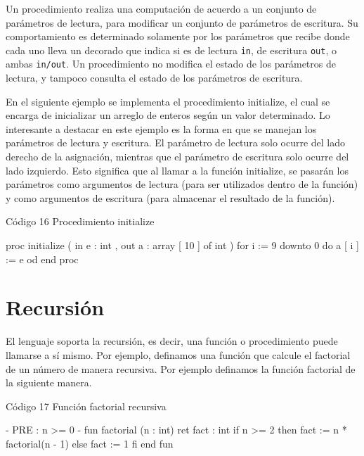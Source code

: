 Un procedimiento realiza una computación de acuerdo a un conjunto de parámetros de lectura, para modificar un conjunto de parámetros de escritura. Su comportamiento es determinado solamente por los parámetros que recibe donde cada uno lleva un decorado que indica si es de lectura \texttt{in}, de escritura \texttt{out}, o ambas \texttt{in/out}. Un procedimiento no modifica el estado de los parámetros de lectura, y tampoco consulta el estado de los parámetros de escritura.

En el siguiente ejemplo se implementa el procedimiento initialize, el cual se encarga de inicializar un arreglo de enteros según un valor determinado. Lo interesante a destacar en este ejemplo es la forma en que se manejan los parámetros de lectura y escritura. El parámetro de lectura solo ocurre del lado derecho de la asignación, mientras que el parámetro de escritura solo ocurre del lado izquierdo. Esto significa que al llamar a la función initialize, se pasarán los parámetros como argumentos de lectura (para ser utilizados dentro de la función) y como argumentos de escritura (para almacenar el resultado de la función).

\begin{codebox}{Código 16}
\footnotesize Procedimiento initialize
\tcblower
\begin{pascallike}
proc initialize ( in e : int , out a : array [ 10 ] of int )
    for i := 9 downto 0 do
        a [ i ] := e
    od
end proc
\end{pascallike}
\end{codebox}

\section{Recursión}
El lenguaje soporta la recursión, es decir, una función o procedimiento puede llamarse a sí mismo. Por ejemplo, definamos una función que calcule el factorial de un número de manera recursiva. Por ejemplo definamos la función factorial de la siguiente manera.

\begin{codebox}{Código 17}
\footnotesize Función factorial recursiva
\tcblower
\begin{pascallike}
{- PRE : n >= 0 -}
fun factorial (n : int) ret fact : int
    if n >= 2 then
        fact := n * factorial(n - 1)
    else
        fact := 1
    fi
end fun
\end{pascallike}
\end{codebox}

